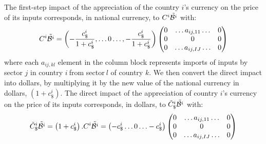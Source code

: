 \documentclass[11pt,a4paper]{paper} %
\begin{document}
The first-step impact of the appreciation of the country $i$’s currency on the price of its inputs corresponds, in national currency, to $C^i{\tilde{{\cal B}^i}}$ with: 
\begin{eqnarray}
C^i{\tilde{{\cal B}^i}}=\left(-\frac{c_\$^i}{1+c_\$^i},\ldots0\ldots,-\frac{c_\$^i}{1+c_\$^i} \right)\left(\begin{matrix}0&\ldots{{{a}}_{ij,11}}\ldots&0\\0&0&0\\0&\ldots{{a}_{{ij,IJ}}}\ldots&0\\\end{matrix}\right) 
\label{eq:eq4}
 \end{eqnarray}
where each ${{{a}}_{{ij,kl}}}$ element in the column block represents imports of inputs by sector $j$ in country $i~$from sector$~l$ of country $k$.
We then convert the direct impact into dollars, by multiplying it by the new value of the national currency in dollars, $\left(1+c_\$^i\right)$. The direct impact of the appreciation of country $i$’s currency on the price of its inputs corresponds, in dollars, to ${\tilde{C}_\$^i}{\tilde{{\cal B}^i}}$ with: 
\begin{eqnarray}
{\tilde{C}_\$^i}{\tilde{{\cal B}^i}}=\left(1+c_\$^i\right).C^i{\tilde{{\cal B}^i}}=
\left(-c_\$^i\ldots0\ldots-c_\$^i\right)\left(\begin{matrix}0&\ldots{{{a}}_{ij,11}}\ldots&0\\0&0&0\\0&\ldots{{a}_{{ij,IJ}}}\ldots&0\\\end{matrix}\right) 
\label{eq:eq4}
 \end{eqnarray}



\end{document}
